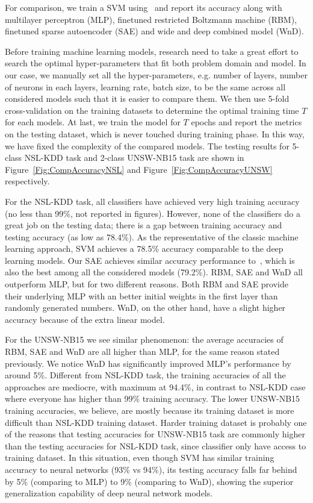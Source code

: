 For comparison, we train a SVM using~\cite{ScikitLearnSVM} and report its accuracy along
with multilayer perceptron (MLP), finetuned restricted Boltzmann machine (RBM),
finetuned sparse autoencoder (SAE) and wide and deep combined model (WnD).

Before training machine learning models, research need to take a great effort to search
the optimal hyper-parameters that fit both problem domain and model.
In our case, we manually set all the hyper-parameters, e.g. number of layers, number of neurons
in each layers, learning rate, batch size, to be the same across all considered models such that
it is easier to compare them.
We then use 5-fold cross-validation on the training datasets to determine the optimal training time $T$
for each models.
At last, we train the model for $T$ epochs and report the metrics on the testing dataset,
which is never touched during training phase.
In this way, we have fixed the complexity of the compared models.
The testing results for 5-class NSL-KDD task and 2-class UNSW-NB15 task are
shown in Figure~\ref{Fig:CompAccuracyNSL} and Figure~\ref{Fig:CompAccuracyUNSW} respectively.

For the NSL-KDD task, all classifiers have achieved very high training accuracy (no less than 99\%, not reported in figures).
However, none of the classifiers do a great job on the testing data;
there is a gap between training accuracy and testing accuracy (as low as 78.4\%).
As the representative of the classic machine learning approach, SVM achieves a 78.5\% accuracy
comparable to the deep learning models.
Our SAE achieves similar accuracy performance to~\cite{STL-NIDS}, which is
also the best among all the considered models (79.2\%).
RBM, SAE and WnD all outperform MLP, but for two different reasons.
Both RBM and SAE provide their underlying MLP with an better initial weights in the first layer
than randomly generated numbers.
WnD, on the other hand, have a slight higher accuracy because of the extra linear model.

For the UNSW-NB15 we see similar phenomenon: the average accuracies of RBM, SAE and WnD are
all higher than MLP, for the same reason stated previously.
We notice WnD has significantly improved MLP's performance by around 5\%.
Different from NSL-KDD task, the training accuracies of all the approaches are mediocre,
with maximum at 94.4\%, in contrast to NSL-KDD case where everyone has higher than 99\% training accuracy.
The lower UNSW-NB15 training accuracies, we believe, are mostly because its training dataset
is more difficult than NSL-KDD training dataset.
Harder training dataset is probably one of the reasons that testing accuracies for UNSW-NB15 task
are commonly higher than the testing accuracies for NSL-KDD task,
since classifier only have access to training dataset.
In this situation, even though SVM has similar training accuracy to neural networks (93\% vs 94\%),
its testing accuracy falls far behind by 5\% (comparing to MLP) to 9\% (comparing to WnD),
showing the superior generalization capability of deep neural network models.

